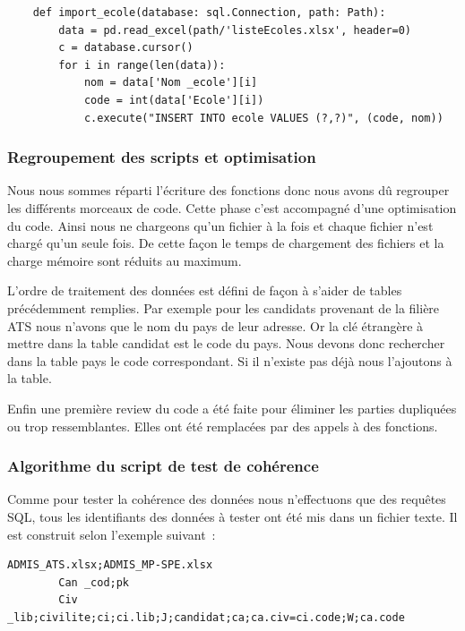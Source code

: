\documentclass[12pt]{article}
\begin{document}
            \begin{verbatim}
    def import_ecole(database: sql.Connection, path: Path):
        data = pd.read_excel(path/'listeEcoles.xlsx', header=0)
        c = database.cursor()
        for i in range(len(data)):
            nom = data['Nom _ecole'][i]
            code = int(data['Ecole'][i])
            c.execute("INSERT INTO ecole VALUES (?,?)", (code, nom))
            \end{verbatim}
            
        \subsubsection{Regroupement des scripts et optimisation}
            Nous nous sommes réparti l'écriture des fonctions donc nous avons dû regrouper les différents morceaux de code. Cette phase c'est accompagné d'une optimisation du code.
            Ainsi nous ne chargeons qu'un fichier à la fois et chaque fichier n'est chargé qu'un seule fois. De cette façon le temps de chargement des fichiers et la charge mémoire sont réduits au maximum.
            
            L'ordre de traitement des données est défini de façon à s'aider de tables précédemment remplies.
            Par exemple pour les candidats provenant de la filière ATS nous n'avons que le nom du pays de leur adresse. Or la clé étrangère à mettre dans la table candidat est le code du pays. Nous devons donc rechercher dans la table pays le code correspondant. Si il n'existe pas déjà nous l'ajoutons à la table.
            
            Enfin une première review du code a été faite pour éliminer les parties dupliquées ou trop ressemblantes. Elles ont été remplacées par des appels à des fonctions.
        
        \subsubsection{Algorithme du script de test de cohérence}
        
        Comme pour tester la cohérence des données nous n'effectuons que des requêtes \textsf{SQL}, tous les identifiants des données à tester ont été mis dans un fichier texte. Il est construit selon l'exemple suivant~:
        
        \begin{verbatim}
ADMIS_ATS.xlsx;ADMIS_MP-SPE.xlsx
    	Can _cod;pk
    	Civ _lib;civilite;ci;ci.lib;J;candidat;ca;ca.civ=ci.code;W;ca.code
        \end{verbatim}
        
\end{document}
